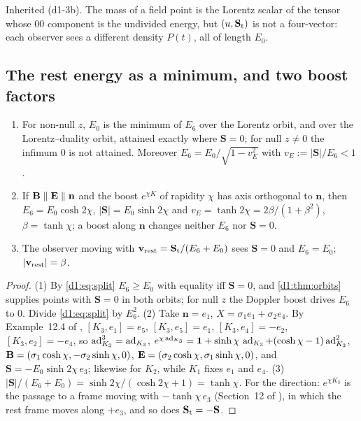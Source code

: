 Inherited \cite{Rainich1925,Synge56} (d1-3b). The mass of a field point is the Lorentz scalar of the tensor whose $00$ component is the undivided
energy, but $(u,\mathbf S_{\rm t})$ is not a four-vector: each observer sees a different density $P(t)$, all of length $E_0$.

\subsection{The rest energy as a minimum, and two boost factors}
\label{d1:sec:min}

\begin{theorem}
\label{d1:thm:min}
\begin{enumerate}
\item For non-null $z$, $E_0$ is the minimum of $E_6$ over the Lorentz orbit, and over the Lorentz--duality orbit, attained exactly where
$\mathbf S=0$; for null $z\neq0$ the infimum $0$ is not attained. Moreover $E_6=E_0/\sqrt{1-v_E^2}$ with $v_E:=|\mathbf S|/E_6<1$.
\item If $\mathbf B\parallel\mathbf E\parallel\mathbf n$ and the boost $e^{\chi K}$ of rapidity $\chi$ has axis orthogonal to $\mathbf n$, then $E_6=E_0\cosh2\chi$,
$|\mathbf S|=E_0\sinh2\chi$ and $v_E=\tanh2\chi=2\beta/(1+\beta^2)$, $\beta=\tanh\chi$; a boost along $\mathbf n$ changes neither $E_6$ nor $\mathbf S=0$.
\item The observer moving with $\mathbf v_{\rm rest}=\mathbf S_{\rm t}/(E_6+E_0)$ sees $\mathbf S=0$ and $E_6=E_0$; $|\mathbf v_{\rm rest}|=\beta$.
\end{enumerate}
\end{theorem}

\begin{proof}
(1) By \eqref{d1:eq:split} $E_6\ge E_0$ with equality iff $\mathbf S=0$, and \cref{d1:thm:orbits} supplies points with $\mathbf S=0$ in both orbits; for
null $z$ the Doppler boost drives $E_6$ to $0$. Divide \eqref{d1:eq:split} by $E_6^2$. (2) Take $\mathbf n=e_1$, $X=\sigma_1e_1+\sigma_2e_4$. By Example~12.4 of
\cite{ES17}, $[K_3,e_1]=e_5$, $[K_3,e_5]=e_1$, $[K_3,e_4]=-e_2$, $[K_3,e_2]=-e_4$, so $\operatorname{ad}_{K_3}^3=\operatorname{ad}_{K_3}$,
$e^{\chi\operatorname{ad}_{K_3}}=\mathbf 1+\sinh\chi\,\operatorname{ad}_{K_3}+(\cosh\chi-1)\operatorname{ad}_{K_3}^2$, $\mathbf B=(\sigma_1\cosh\chi,-\sigma_2\sinh\chi,0)$, $\mathbf E=(\sigma_2\cosh\chi,\sigma_1\sinh\chi,0)$,
and $\mathbf S=-E_0\sinh2\chi\,e_3$; likewise for $K_2$, while $K_1$ fixes $e_1$ and $e_4$. (3) $|\mathbf S|/(E_6+E_0)=\sinh2\chi/(\cosh2\chi+1)=\tanh\chi$. For the direction: $e^{\chi K_3}$ is the passage to a frame moving with
$-\tanh\chi\,e_3$ (Section~12 of \cite{ES17}), in which the rest frame moves along $+e_3$, and so does $\mathbf S_{\rm t}=-\mathbf S$.
\end{proof}

